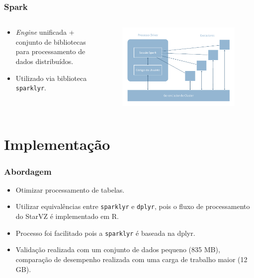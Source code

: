 \documentclass{beamer}
\begin{document}
\begin{frame}
 \frametitle{Spark}
 \begin{columns}[T] %
  \begin{column}{.40\textwidth}
  \begin{itemize}
  \item \textit{Engine} unificada + conjunto de bibliotecas para processamento 
de dados distribuídos.
  \item Utilizado via biblioteca \texttt{sparklyr}.
  \end{itemize}
  \end{column}%
  \hfill%
  \begin{column}{.56\textwidth}
  \begin{figure}[ht]
  \centerline{\includegraphics[width=1\textwidth]{./img/spark-arch.pdf}}
  \label{fig:spark-arch}
  \end{figure}
  \end{column}%
  \end{columns}
\end{frame}

\section{Implementação}
\begin{frame}
 \frametitle{Abordagem}
 \begin{itemize}
  \item Otimizar processamento de tabelas.
  \item Utilizar equivalências entre \texttt{sparklyr} e \texttt{dplyr}, pois o 
fluxo de processamento do StarVZ é implementado em R.
  \item Processo foi facilitado pois a \texttt{sparklyr} é baseada na {dplyr}.
  \item Validação realizada com um conjunto de dados pequeno (835 MB), 
comparação de desempenho realizada com uma carga de trabalho maior (12 GB).
 \end{itemize}
\end{frame}
\end{document}
